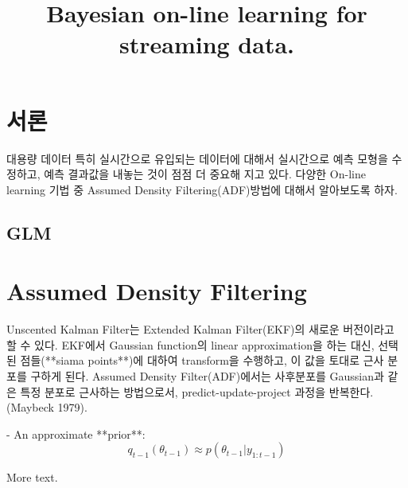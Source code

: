 \documentclass[11pt]{book} %
\title{Bayesian on-line learning for streaming data.}
\author{}
\begin{document}
\maketitle

\tableofcontents




\chapter{서론}

 대용량 데이터 특히 실시간으로 유입되는 데이터에 대해서 실시간으로 예측 모형을 수정하고, 예측 결과값을 내놓는 것이 점점 더 중요해 지고 있다. 다양한 On-line learning 기법 중 Assumed Density Filtering(ADF)방법에 대해서 알아보도록 하자.

\section{GLM}

\chapter{Assumed Density Filtering}
Unscented Kalman Filter는 Extended Kalman Filter(EKF)의 새로운 버전이라고 할 수 있다. EKF에서 Gaussian function의 linear approximation을 하는 대신, 선택된 점들(**siama points**)에 대하여 transform을 수행하고, 이 값을 토대로 근사 분포를 구하게 된다.
Assumed Density Filter(ADF)에서는 사후분포를 Gaussian과 같은 특정 분포로 근사하는 방법으로서, predict-update-project 과정을 반복한다.(Maybeck 1979).


- An approximate **prior**: $$q_{t-1}(\theta_{t-1}) \approx p(\theta_{t-1}|y_{1:t-1})$$







More text.
\end{document}
